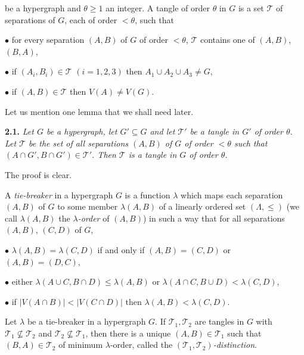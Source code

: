 \noindent be a hypergraph and $\theta \ge 1$ an integer. A tangle of order $\theta$ in $G$ is a set $\mathcal{T}$ of separations of $G$, each of order $< \theta$, such that

\hspace*{12pt}$\bullet$ for every separation $(A, B)$ of $G$ of order $< \theta$, $\mathcal{T}$ contains one of $(A, B)$, $(B, A)$,

\hspace*{12pt}$\bullet$ if $(A_i, B_i) \in \mathcal{T}$ $(i = 1, 2, 3)$ then $A_1 \cup A_2 \cup A_3 \ne G$,

\hspace*{12pt}$\bullet$ if $(A, B) \in \mathcal{T}$ then $V(A) \ne V(G)$.

Let us mention one lemma that we shall need later.

\textbf{2.1.} \textit{Let $G$ be a hypergraph, let $G' \subseteq G$ and let $\mathcal{T}'$ be a tangle in $G'$ of order $\theta$. Let $\mathcal{T}$ be the set of all separations $(A, B)$ of $G$ of order $< \theta$ such that $(A \cap G', B \cap G') \in \mathcal{T}'$. Then $\mathcal{T}$ is a tangle in $G$ of order $\theta$.}

The proof is clear.

A \textit{tie-breaker} in a hypergraph $G$ is a function $\lambda$ which maps each separation $(A, B)$ of $G$ to some member $\lambda(A, B)$ of a linearly ordered set $(\Lambda, \le)$ (we call $\lambda(A, B)$ the \textit{$\lambda$-order} of $(A, B)$) in such a way that for all separations $(A, B)$, $(C, D)$ of $G$,

\hspace*{12pt}$\bullet$ $\lambda(A, B) = \lambda(C, D)$ if and only if $(A, B) = (C, D)$ or $(A, B) = (D, C)$,

\hspace*{12pt}$\bullet$ either $\lambda(A \cup C, B \cap D) \le \lambda(A, B)$ or $\lambda(A \cap C, B \cup D) < \lambda(C, D)$,

\hspace*{12pt}$\bullet$ if $|V(A \cap B)| < |V(C \cap D)|$ then $\lambda(A, B) < \lambda(C, D)$.

Let $\lambda$ be a tie-breaker in a hypergraph $G$. If $\mathcal{T}_1, \mathcal{T}_2$ are tangles in $G$ with $\mathcal{T}_1 \nsubseteq \mathcal{T}_2$ and $\mathcal{T}_2 \nsubseteq \mathcal{T}_1$, then there is a unique $(A, B) \in \mathcal{T}_1$ such that $(B, A) \in \mathcal{T}_2$ of minimum $\lambda$-order, called the \textit{$(\mathcal{T}_1, \mathcal{T}_2)$-distinction}.

